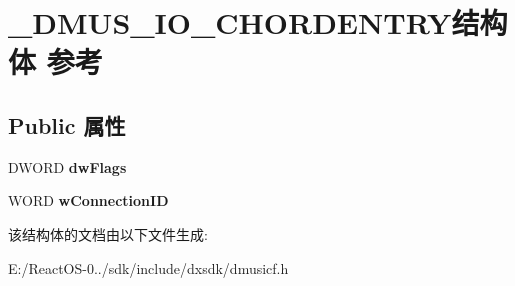 \hypertarget{struct___d_m_u_s___i_o___c_h_o_r_d_e_n_t_r_y}{}\section{\+\_\+\+D\+M\+U\+S\+\_\+\+I\+O\+\_\+\+C\+H\+O\+R\+D\+E\+N\+T\+R\+Y结构体 参考}
\label{struct___d_m_u_s___i_o___c_h_o_r_d_e_n_t_r_y}
\subsection*{Public 属性}
\begin{DoxyCompactItemize}
\item 
\mbox{\label{struct___d_m_u_s___i_o___c_h_o_r_d_e_n_t_r_y_ad8f136c5fc7f206f8157cc914ff7a006}} 
D\+W\+O\+RD {\bfseries dw\+Flags}
\item 
\mbox{\label{struct___d_m_u_s___i_o___c_h_o_r_d_e_n_t_r_y_a9214f6e2f526a91b18d33dc92816d73d}} 
W\+O\+RD {\bfseries w\+Connection\+ID}
\end{DoxyCompactItemize}


该结构体的文档由以下文件生成\+:\begin{DoxyCompactItemize}
\item 
E\+:/\+React\+O\+S-\/0../sdk/include/dxsdk/dmusicf.\+h\end{DoxyCompactItemize}
